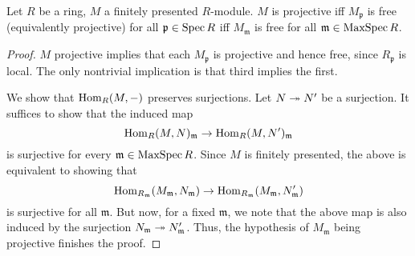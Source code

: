 \begin{thm} \label{thm:projective-locally-free}
	Let $R$ be a ring, $M$ a finitely presented $R$-module. $M$ is projective iff $M_{\mathfrak{p}}$ is free (equivalently projective) for all $\mathfrak{p} \in \operatorname{Spec} R$ iff $M_{\mathfrak{m}}$ is free for all $\mathfrak{m} \in \operatorname{MaxSpec} R$.
\end{thm}
\begin{proof} 
	$M$ projective implies that each $M_{\mathfrak{p}}$ is projective and hence free, since $R_{\mathfrak{p}}$ is local. The only nontrivial implication is that third implies the first.

	We show that $\operatorname{Hom}_{R}(M, -)$ preserves surjections. Let $N \twoheadrightarrow N'$ be a surjection. It suffices to show that the induced map
	\begin{equation*} 
		\operatorname{Hom}_{R}(M, N)_{\mathfrak{m}} \to \operatorname{Hom}_{R}(M, N')_{\mathfrak{m}}
	\end{equation*}
	is surjective for every $\mathfrak{m} \in \operatorname{MaxSpec} R$. Since $M$ is finitely presented, the above is equivalent to showing that
	\begin{equation*} 
		\operatorname{Hom}_{R_{\mathfrak{m}}}(M_{\mathfrak{m}}, N_{\mathfrak{m}}) \to \operatorname{Hom}_{R_{\mathfrak{m}}}(M_{\mathfrak{m}}, N'_{\mathfrak{m}})
	\end{equation*}
	is surjective for all $\mathfrak{m}$. But now, for a fixed $\mathfrak{m}$, we note that the above map is also induced by the surjection $N_{\mathfrak{m}} \twoheadrightarrow N'_{\mathfrak{m}}$. Thus, the hypothesis of $M_{\mathfrak{m}}$ being projective finishes the proof.
\end{proof}